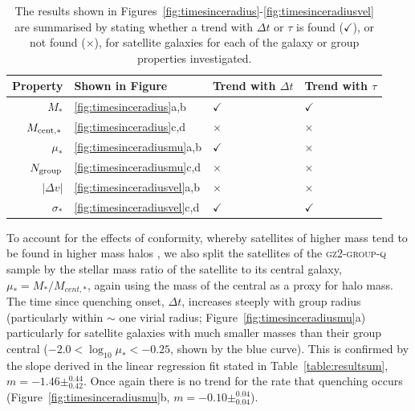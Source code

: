 \documentclass[useAMS,usenatbib]{mn2e}
\begin{document}
\begin{table}
\centering
\caption{The results shown in Figures~\ref{fig:timesinceradius}-\ref{fig:timesinceradiusvel} are summarised by stating whether a trend with $\Delta t$ or $\tau$ is found ($\checkmark$), or not found ($\times$), for satellite galaxies for each of the galaxy or group properties investigated.}
\label{table:summary}
%
%
%
\setlength\extrarowheight{3pt}
\begin{tabularx}{\textwidth}{r|C|C|C}

\hline
Property & Shown in Figure & Trend with $\Delta t$ & Trend with $\tau$        \\ \hline
$M_*$                 & \ref{fig:timesinceradius}a,b            & $\checkmark$           & $\checkmark$       \\
$M_{\rm{cent},*}$     & \ref{fig:timesinceradius}c,d            & $\times$               & $\times$           \\
$\mu_*$               & \ref{fig:timesinceradiusmu}a,b           & $\checkmark$           & $\times$           \\
$N_{\rm{group}}$      & \ref{fig:timesinceradiusmu}c,d           & $\times$               & $\times$           \\
$|\Delta v|$          & \ref{fig:timesinceradiusvel}a,b           & $\times$               & $\times$           \\
$\sigma_*$            & \ref{fig:timesinceradiusvel}c,d           & $\checkmark$           & $\checkmark$       \\ \hline

\end{tabularx}
\end{table}

To account for the effects of conformity, whereby satellites of higher mass tend to be found in higher mass halos \citep{weinmann06, kauffmann13, hearin15, hatfield16}, we also split the satellites of the \textsc{gz2-group-q} sample by the stellar mass ratio of the satellite to its central galaxy, $\mu_* = M_*/M_{cent,*}$, again using the mass of the central as a proxy for halo mass. The time since quenching onset, $\Delta t $, increases steeply with group radius (particularly within $\sim$ one virial radius; Figure~\ref{fig:timesinceradiusmu}a) particularly for satellite galaxies with much smaller masses than their group central ($-2.0 < \log_{10}\mu_* < -0.25$, shown by the blue curve). This is confirmed by the slope derived in the linear regression fit stated in Table~\ref{table:resultsum}, $m=-1.46\pm_{0.42}^{0.44}$. Once again there is no trend for the rate that quenching occurs (Figure~\ref{fig:timesinceradiusmu}b, $m=-0.10\pm_{0.04}^{0.04}$). 
\end{document}
